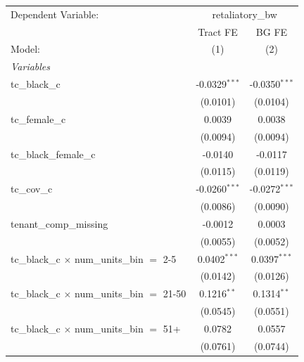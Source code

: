 \begingroup
\centering
\begin{tabular}{lcc}
   \tabularnewline \midrule \midrule
   Dependent Variable: & \multicolumn{2}{c}{retaliatory\_bw}\\
                                                         & Tract FE        & BG FE \\   
   Model:                                                & (1)             & (2)\\  
   \midrule
   \emph{Variables}\\
   tc\_black\_c                                          & -0.0329$^{***}$ & -0.0350$^{***}$\\   
                                                         & (0.0101)        & (0.0104)\\   
   tc\_female\_c                                         & 0.0039          & 0.0038\\   
                                                         & (0.0094)        & (0.0094)\\   
   tc\_black\_female\_c                                  & -0.0140         & -0.0117\\   
                                                         & (0.0115)        & (0.0119)\\   
   tc\_cov\_c                                            & -0.0260$^{***}$ & -0.0272$^{***}$\\   
                                                         & (0.0086)        & (0.0090)\\   
   tenant\_comp\_missing                                 & -0.0012         & 0.0003\\   
                                                         & (0.0055)        & (0.0052)\\   
   tc\_black\_c $\times$ num\_units\_bin $=$ 2-5         & 0.0402$^{***}$  & 0.0397$^{***}$\\   
                                                         & (0.0142)        & (0.0126)\\   
   tc\_black\_c $\times$ num\_units\_bin $=$ 21-50       & 0.1216$^{**}$   & 0.1314$^{**}$\\   
                                                         & (0.0545)        & (0.0551)\\   
   tc\_black\_c $\times$ num\_units\_bin $=$ 51+         & 0.0782          & 0.0557\\   
                                                         & (0.0761)        & (0.0744)\\   

\end{tabular}
